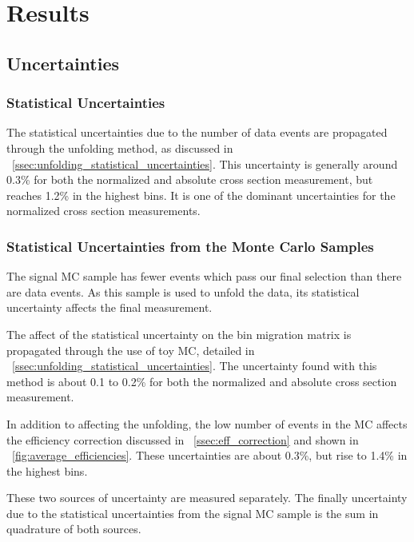\chapter{Results}
\label{chapter:results}

\section{Uncertainties}
\label{sec:uncertainties}

\subsection{Statistical Uncertainties}
\label{ssec:stat_uncertainty}

The statistical uncertainties due to the number of data events are propagated
through the unfolding method, as discussed in
\SEC~\ref{ssec:unfolding_statistical_uncertainties}. This uncertainty is
generally around 0.3\% for both the normalized and absolute cross section
measurement, but reaches 1.2\% in the highest \phistar bins. It is one of the
dominant uncertainties for the normalized cross section measurements.

\subsection{Statistical Uncertainties from the Monte Carlo Samples}
\label{ssec:mc_stat_uncertainty}

The \MADGRAPH signal MC sample has fewer events which pass our final selection
than there are data events. As this sample is used to unfold the data, its
statistical uncertainty affects the final measurement.

The affect of the statistical uncertainty on the bin migration matrix is
propagated through the use of toy MC, detailed in
\SEC~\ref{ssec:unfolding_statistical_uncertainties}. The uncertainty found with
this method is about 0.1 to 0.2\% for both the normalized and absolute cross
section measurement.

In addition to affecting the unfolding, the low number of events in the MC
affects the efficiency correction discussed in \SEC~\ref{ssec:eff_correction}
and shown in \FIG~\ref{fig:average_efficiencies}. These uncertainties are about
0.3\%, but rise to 1.4\% in the highest \phistar bins.

These two sources of uncertainty are measured separately. The finally
uncertainty due to the statistical uncertainties from the \MADGRAPH signal MC
sample is the sum in quadrature of both sources.

